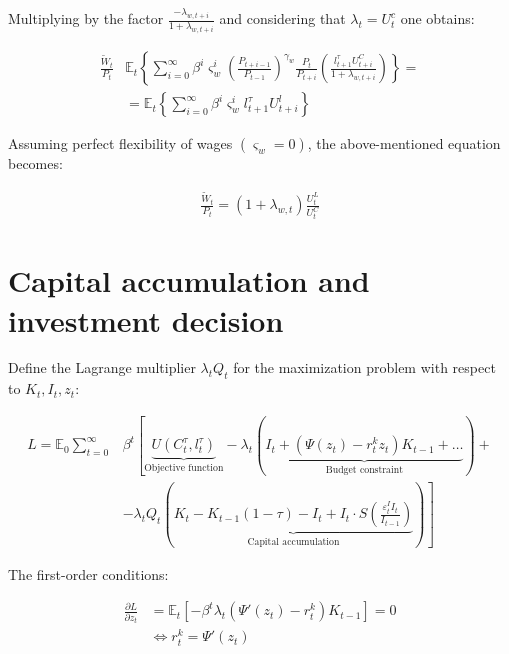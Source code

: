 \documentclass{pracamgr}
\numberwithin{equation}{section}
\begin{document}
Multiplying by the factor $\frac{-\lambda_{w,t+i}}{1+\lambda_{w,t+i}}$ and considering that $\lambda_{t} = U_{t}^{c}$ one obtains:

\begin{align}
\frac{\widetilde{W}_{t}}{P_{t}} &\mathbb{E}_{t} \left\{ \sum\limits_{i=0}^{\infty} \beta^{i} \varsigma_{w}^{i} \left( \frac{P_{t+i-1}}{P_{t-1}} \right)^{\gamma_{w}}  \frac{P_{t}}{P_{t+i}} \left( \frac{l_{t+1}^{\tau} U_{t+i}^{C}}{1 + \lambda_{w, t+i}} \right) \right\} = \nonumber \\
&= \mathbb{E}_{t} 
\left\{ \sum\limits_{i=0}^{\infty} \beta^{i} \varsigma_{w}^{i} l_{t+1}^{\tau} U_{t+i}^{l} \right\}
\end{align}

Assuming perfect flexibility of wages $(\varsigma_{w} = 0)$, the above-mentioned equation becomes:

\begin{align}
\frac{\widetilde{W}_{t}}{P_{t}} = \left(1 + \lambda_{w, t} \right)\frac{U_{t}^{L}}{U_{t}^{C}}
\end{align}

\section*{Capital accumulation and investment decision}

Define the Lagrange multiplier $\lambda_{t} Q_{t}$ for the maximization problem with respect to $K_{t}, I_{t}, z_{t}$:

\begin{align}
L = \mathbb{E}_{0} \sum\limits_{t=0}^{\infty} &\beta^{t} \left[\underbrace{U \left(C_{t}^{\tau}, l_{t}^{\tau} \right)}_\text{Objective function} - \lambda_{t} \left( \underbrace{I_{t} + \left(\Psi(z_{t}) - r_{t}^{k}z_{t}\right)K_{t-1} + \ldots}_\text{Budget constraint} \right) + \nonumber \right.  \\ 
& \left. - \lambda_{t} Q_{t} \left( \underbrace{K_{t} - K_{t-1} (1 - \tau) - I_{t}  + I_{t} \cdot S \left(\frac{\varepsilon_{t}^{I}I_{t}}{I_{t-1}} \right)}_\text{Capital accumulation} \right) \right]
\end{align}

The first-order conditions:

\begin{align}
\frac{\partial L}{\partial z_{t}} &= \mathbb{E}_{t} \left[ -\beta^{t} \lambda_{t} \left( \Psi'(z_{t}) - r_{t}^{k} \right) K_{t-1} \right] = 0 \nonumber \\
& \iff r_{t}^{k} = \Psi'(z_{t})
\end{align}
\end{document}
